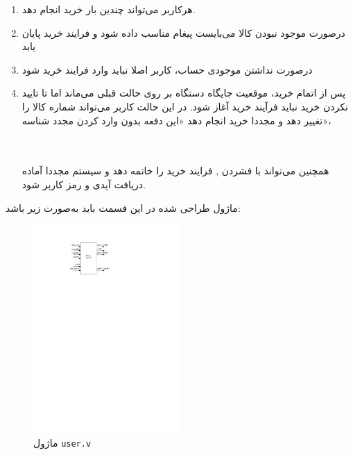 \documentclass[]{article}
\begin{document}
\begin{enumerate}
	\item هرکاربر می‌تواند چندین بار خرید انجام دهد.
	\item درصورت موجود نبودن کالا می‌بایست پیغام مناسب داده شود و فرایند خرید پایان یابد
	\item درصورت نداشتن موجودی حساب، کاربر اصلا نباید وارد فرایند خرید شود
	

	
	\item پس از اتمام خرید، موقعیت جایگاه دستگاه بر روی حالت قبلی می‌ماند اما تا تایید نکردن خرید نباید فرآیند خرید آغاز شود. در این حالت کاربر می‌تواند شماره کالا را تغییر دهد و مجددا خرید انجام دهد «این دفعه بدون وارد کردن مجدد شناسه»،
	
	\newpage
	\Large \textbf{\\\\
	}
	 همچنین می‌تواند با فشردن ,  فرایند خرید را خاتمه دهد و سیستم مجددا آماده دریافت آیدی و رمز کاربر شود.
\end{enumerate}




ماژول طراحی شده در این قسمت باید به‌صورت زیر باشد:

\begin{figure}[h]
	\centering
	\includegraphics[width=0.5\textwidth]{images/user.pdf}
	\caption{ماژول \texttt{user.v}}
	\label{ماژول user.v}
\end{figure}





\newpage
\Large \textbf{\\
}
\end{document}
